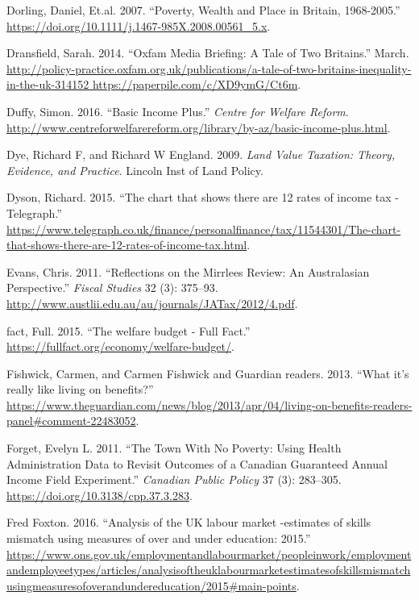 \documentclass[]{tufte-handout}
\begin{document}
\leavevmode\hypertarget{ref-DorlingDaniel2007}{}%
Dorling, Daniel, Et.al. 2007. ``Poverty, Wealth and Place in Britain,
1968-2005.'' \url{https://doi.org/10.1111/j.1467-985X.2008.00561_5.x}.

\leavevmode\hypertarget{ref-Dransfield2014}{}%
Dransfield, Sarah. 2014. ``Oxfam Media Briefing: A Tale of Two
Britains.'' March.
\href{http://policy-practice.oxfam.org.uk/publications/a-tale-of-two-britains-inequality-in-the-uk-314152\%20https://paperpile.com/c/XD9ymG/Ct6m}{http://policy-practice.oxfam.org.uk/publications/a-tale-of-two-britains-inequality-in-the-uk-314152 https://paperpile.com/c/XD9ymG/Ct6m}.

\leavevmode\hypertarget{ref-Duffy}{}%
Duffy, Simon. 2016. ``Basic Income Plus.'' \emph{Centre for Welfare
Reform}.
\url{http://www.centreforwelfarereform.org/library/by-az/basic-income-plus.html}.

\leavevmode\hypertarget{ref-Dye2009}{}%
Dye, Richard F, and Richard W England. 2009. \emph{Land Value Taxation:
Theory, Evidence, and Practice}. Lincoln Inst of Land Policy.

\leavevmode\hypertarget{ref-Dyson2015}{}%
Dyson, Richard. 2015. ``The chart that shows there are 12 rates of
income tax - Telegraph.''
\url{https://www.telegraph.co.uk/finance/personalfinance/tax/11544301/The-chart-that-shows-there-are-12-rates-of-income-tax.html}.

\leavevmode\hypertarget{ref-evans2011reflections}{}%
Evans, Chris. 2011. ``Reflections on the Mirrlees Review: An
Australasian Perspective.'' \emph{Fiscal Studies} 32 (3): 375--93.
\url{http://www.austlii.edu.au/au/journals/JATax/2012/4.pdf}.

\leavevmode\hypertarget{ref-Fullfact2015}{}%
fact, Full. 2015. ``The welfare budget - Full Fact.''
\url{https://fullfact.org/economy/welfare-budget/}.

\leavevmode\hypertarget{ref-Fishwick2013}{}%
Fishwick, Carmen, and Carmen Fishwick and Guardian readers. 2013. ``What
it's really like living on benefits?''
\url{https://www.theguardian.com/news/blog/2013/apr/04/living-on-benefits-readers-panel\#comment-22483052}.

\leavevmode\hypertarget{ref-Forget2011}{}%
Forget, Evelyn L. 2011. ``The Town With No Poverty: Using Health
Administration Data to Revisit Outcomes of a Canadian Guaranteed Annual
Income Field Experiment.'' \emph{Canadian Public Policy} 37 (3):
283--305. \url{https://doi.org/10.3138/cpp.37.3.283}.

\leavevmode\hypertarget{ref-FredFoxton2016}{}%
Fred Foxton. 2016. ``Analysis of the UK labour market -estimates of
skills mismatch using measures of over and under education: 2015.''
\url{https://www.ons.gov.uk/employmentandlabourmarket/peopleinwork/employmentandemployeetypes/articles/analysisoftheuklabourmarketestimatesofskillsmismatchusingmeasuresofoverandundereducation/2015\#main-points}.
\end{document}
